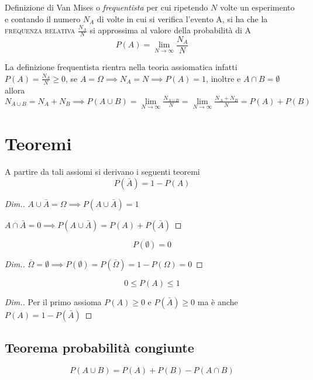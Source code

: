 Definizione di Van Mises o \emph{frequentista} per cui ripetendo $N$
volte un esperimento e contando il numero $N_A$ di volte in cui si verifica l'evento A, si ha che la \textsc{frequenza relativa} $\frac{N_A}{N}$ si approssima al valore della probabilità di A
\begin{equation}P(A)=\lim\limits_{N\to\infty}\frac{N_A}{N}
\end{equation}

La definizione frequentista rientra nella teoria assiomatica infatti
$P(A)=\frac{N_A}{N}\geq 0$, se $A=\Omega\implies N_A=N\implies P(A)=1$, inoltre 
e $A\cap B=\emptyset$ allora $N_{A\cup B}=N_A+N_B\implies P(A\cup B)= \lim\limits_{N\to\infty}\frac{N_{A\cup B}}{N}=\lim\limits_{N\to\infty}\frac{N_A+N_B}{N}=P(A)+P(B)$

\section{Teoremi}
A partire da tali assiomi si derivano i seguenti teoremi
\begin{equation}P(\bar{A})=1-P(A)\end{equation}

\begin{proof}[Dim.] $A\cup\bar{A}=\Omega\implies P(A\cup\bar{A})=1$

$A\cap\bar{A}=0\implies P(A\cup\bar{A})=P(A)+P(\bar{A})$
\end{proof}

\begin{equation}P(\emptyset)=0\end{equation}

\begin{proof}[Dim.] $\bar{\Omega}=\emptyset\implies P(\emptyset)=P(\bar{\Omega})=1-P(\Omega)=0$
\end{proof}

\begin{equation}0\leq P(A)\leq 1\end{equation}

\begin{proof}[Dim.] Per il primo assioma $P(A)\geq 0$ e $P(\bar{A})\geq 0$ ma è anche $P(A)=1-P(\bar{A})$
\end{proof}

\subsection{Teorema probabilità congiunte}
\begin{equation}P(A\cup B)=P(A)+P(B)-P(A\cap B)\end{equation}

